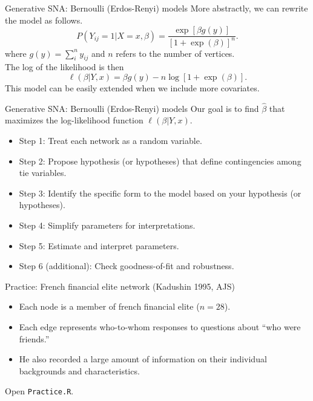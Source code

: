 \documentclass[10pt]{beamer}
\begin{document}
\begin{frame}{Generative SNA: Bernoulli (Erdos-Renyi) models}
More abstractly, we can rewrite the model as follows.
	\begin{equation}
	P(Y_{ij}=1 | X=x,\beta) = \frac{\exp[\beta g(y)]}{[1+\exp(\beta)]^n}.
	\end{equation}
where $g(y)=\sum_i^n y_{ij}$ and $n$ refers to the number of vertices.\\
\vspace{0.1cm}
The log of the likelihood is then
	\begin{equation}
	\ell(\beta|Y,x) = \beta g(y)-n\log[1+\exp(\beta)].
	\end{equation}
This model can be easily extended when we include more covariates.
\end{frame}

\begin{frame}{Generative SNA: Bernoulli (Erdos-Renyi) models}
Our goal is to find $\hat{\beta}$ that maximizes the log-likelihood function $\ell(\beta|Y,x)$.

	\begin{itemize}
		\item Step 1: Treat each network as a random variable.
		\item Step 2: Propose hypothesis (or hypotheses) that define contingencies among tie variables.
		\item Step 3: Identify the specific form to the model based on your hypothesis (or hypotheses).
		\item Step 4: Simplify parameters for interpretations.
		\item Step 5: Estimate and interpret parameters.
		\item Step 6 (additional): Check goodness-of-fit and robustness.
	\end{itemize}
\end{frame}

\begin{frame}{Practice: French financial elite network (Kadushin 1995, AJS)}
	\begin{itemize}
		\item Each node is a member of french financial elite ($n=28$).
		\item Each edge represents who-to-whom responses to questions about ``who were friends.''
		\item He also recorded a large amount of information on their individual backgrounds and characteristics.
	\end{itemize}
\vspace{0.2cm}
Open \texttt{Practice.R}.
\end{frame}
\end{document}
